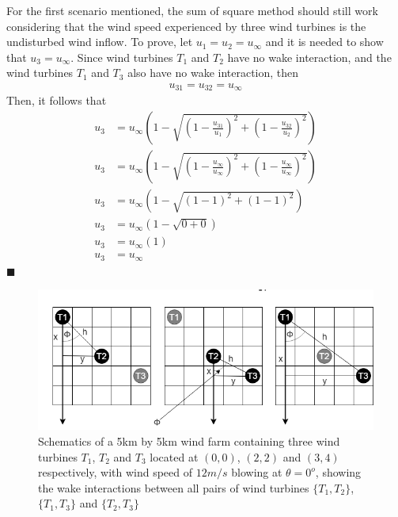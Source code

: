     For the first scenario mentioned, the sum of square method should still work considering that the wind speed experienced by three wind turbines is the undisturbed wind inflow. To prove, let $u_1=u_2=u_\infty$ and it is needed to show that $u_3=u_\infty$. Since wind turbines $T_1$ and $T_2$ have no wake interaction, and the wind turbines $T_1$ and $T_3$ also have no wake interaction, then
    \begin{align*}
        u_{31}=u_{32}=u_\infty
    \end{align*}
    Then, it follows that
    \begin{align*}
        u_3 &= u_\infty\left( 1-\sqrt{\left( 1-\frac{u_{31}}{u_1} \right)^2 + \left( 1-\frac{u_{32}}{u_2} \right)^2} \right) \\
        u_3 &= u_\infty\left( 1-\sqrt{\left( 1-\frac{u_\infty}{u_\infty} \right)^2 + \left( 1-\frac{u_\infty}{u_\infty} \right)^2} \right) \\
        u_3 &= u_\infty\left( 1-\sqrt{\left( 1-1 \right)^2 + \left( 1-1 \right)^2} \right) \\
        u_3 &= u_\infty\left( 1-\sqrt{0 + 0} \right) \\
        u_3 &= u_\infty\left( 1 \right) \\
        u_3 &= u_\infty
    \end{align*} \hfill $\blacksquare$
    
    \begin{figure}
        \centering
        \includegraphics[width=\linewidth]{Figures/002234.png}
        \caption{Schematics of a 5km by 5km wind farm containing three wind turbines $T_1$, $T_2$ and $T_3$ located at $(0,0)$, $(2,2)$ and $(3,4)$ respectively, with wind speed of $12m/s$ blowing at $\theta=0^o$, showing the wake interactions between all pairs of wind turbines $\{T_1,T_2\}$, $\{T_1,T_3\}$ and $\{T_2,T_3\}$ }
        \label{002234}
    \end{figure}
    
